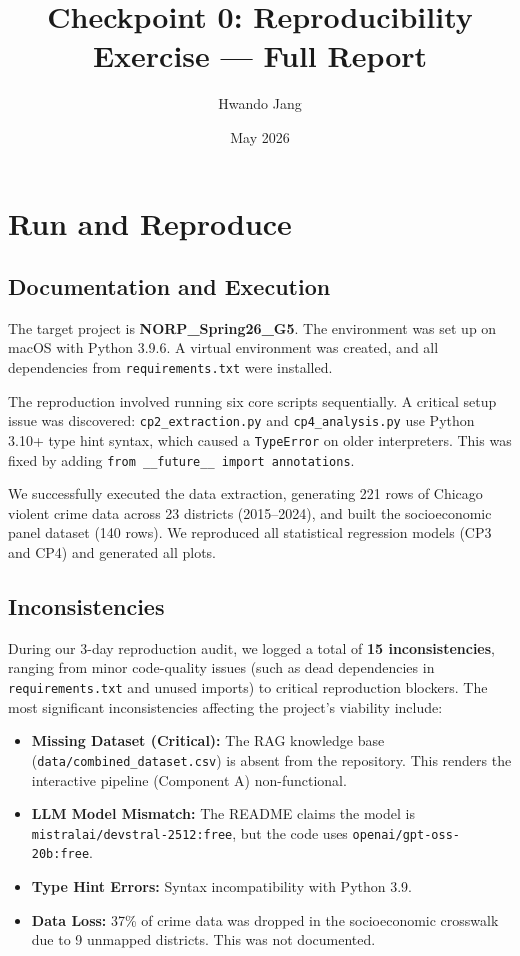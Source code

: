 \documentclass[12pt]{article}
\title{Checkpoint 0: Reproducibility Exercise --- Full Report}
\author{Hwando Jang}
\date{May 2026}
\begin{document}
\maketitle

\section{Run and Reproduce}
\subsection{Documentation and Execution}
The target project is \textbf{NORP\_Spring26\_G5}. The environment was set up on macOS with Python 3.9.6. A virtual environment was created, and all dependencies from \texttt{requirements.txt} were installed.

The reproduction involved running six core scripts sequentially. A critical setup issue was discovered: \texttt{cp2\_extraction.py} and \texttt{cp4\_analysis.py} use Python 3.10+ type hint syntax, which caused a \texttt{TypeError} on older interpreters. This was fixed by adding \texttt{from \_\_future\_\_ import annotations}.

We successfully executed the data extraction, generating 221 rows of Chicago violent crime data across 23 districts (2015--2024), and built the socioeconomic panel dataset (140 rows). We reproduced all statistical regression models (CP3 and CP4) and generated all plots. 

\subsection{Inconsistencies}
During our 3-day reproduction audit, we logged a total of \textbf{15 inconsistencies}, ranging from minor code-quality issues (such as dead dependencies in \texttt{requirements.txt} and unused imports) to critical reproduction blockers. The most significant inconsistencies affecting the project's viability include:
\begin{itemize}
    \item \textbf{Missing Dataset (Critical):} The RAG knowledge base (\nolinkurl{data/combined_dataset.csv}) is absent from the repository. This renders the interactive pipeline (Component A) non-functional.
    \item \textbf{LLM Model Mismatch:} The README claims the model is \nolinkurl{mistralai/devstral-2512:free}, but the code uses \nolinkurl{openai/gpt-oss-20b:free}.
    \item \textbf{Type Hint Errors:} Syntax incompatibility with Python 3.9.
    \item \textbf{Data Loss:} 37\% of crime data was dropped in the socioeconomic crosswalk due to 9 unmapped districts. This was not documented.
\end{itemize}
\end{document}
